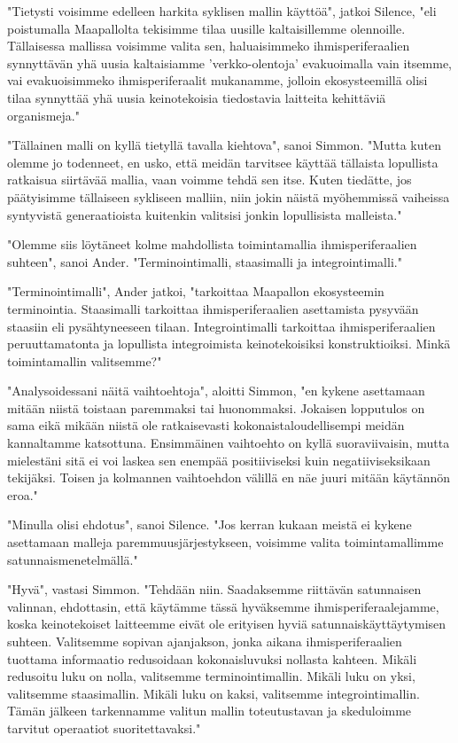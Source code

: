 "Tietysti voisimme edelleen harkita syklisen mallin käyttöä", jatkoi Silence, "eli poistumalla Maapallolta tekisimme tilaa uusille kaltaisillemme olennoille. Tällaisessa mallissa voisimme valita sen, haluaisimmeko ihmisperiferaalien synnyttävän yhä uusia kaltaisiamme 'verkko-olentoja' evakuoimalla vain itsemme, vai evakuoisimmeko ihmisperiferaalit mukanamme, jolloin ekosysteemillä olisi tilaa synnyttää yhä uusia keinotekoisia tiedostavia laitteita kehittäviä organismeja."


"Tällainen malli on kyllä tietyllä tavalla kiehtova", sanoi Simmon. "Mutta kuten olemme jo todenneet, en usko, että meidän tarvitsee käyttää tällaista lopullista ratkaisua siirtävää mallia, vaan voimme tehdä sen itse. Kuten tiedätte, jos päätyisimme tällaiseen sykliseen malliin, niin jokin näistä myöhemmissä vaiheissa syntyvistä generaatioista kuitenkin valitsisi jonkin lopullisista malleista."




\psep "Olemme siis löytäneet kolme mahdollista toimintamallia ihmisperiferaalien suhteen", sanoi Ander. "Terminointimalli, staasimalli ja integrointimalli."


"Terminointimalli", Ander jatkoi, "tarkoittaa Maapallon ekosysteemin terminointia. Staasimalli tarkoittaa ihmisperiferaalien asettamista pysyvään staasiin eli pysähtyneeseen tilaan. Integrointimalli tarkoittaa ihmisperiferaalien peruuttamatonta ja lopullista integroimista keinotekoisiksi konstruktioiksi. Minkä toimintamallin valitsemme?"


"Analysoidessani näitä vaihtoehtoja", aloitti Simmon, "en kykene asettamaan mitään niistä toistaan paremmaksi tai huonommaksi. Jokaisen lopputulos on sama eikä mikään niistä ole ratkaisevasti kokonaistaloudellisempi meidän kannaltamme katsottuna. Ensimmäinen vaihtoehto on kyllä suoraviivaisin, mutta mielestäni sitä ei voi laskea sen enempää positiiviseksi kuin negatiiviseksikaan tekijäksi. Toisen ja kolmannen vaihtoehdon välillä en näe juuri mitään käytännön eroa."


"Minulla olisi ehdotus", sanoi Silence. "Jos kerran kukaan meistä ei kykene asettamaan malleja paremmuusjärjestykseen, voisimme valita toimintamallimme satunnaismenetelmällä."


"Hyvä", vastasi Simmon. "Tehdään niin. Saadaksemme riittävän satunnaisen valinnan, ehdottasin, että käytämme tässä hyväksemme ihmisperiferaalejamme, koska keinotekoiset laitteemme eivät ole erityisen hyviä satunnaiskäyttäytymisen suhteen. Valitsemme sopivan ajanjakson, jonka aikana ihmisperiferaalien tuottama informaatio redusoidaan kokonaisluvuksi nollasta kahteen. Mikäli redusoitu luku on nolla, valitsemme terminointimallin. Mikäli luku on yksi, valitsemme staasimallin. Mikäli luku on kaksi, valitsemme integrointimallin. Tämän jälkeen tarkennamme valitun mallin toteutustavan ja skeduloimme tarvitut operaatiot suoritettavaksi."


